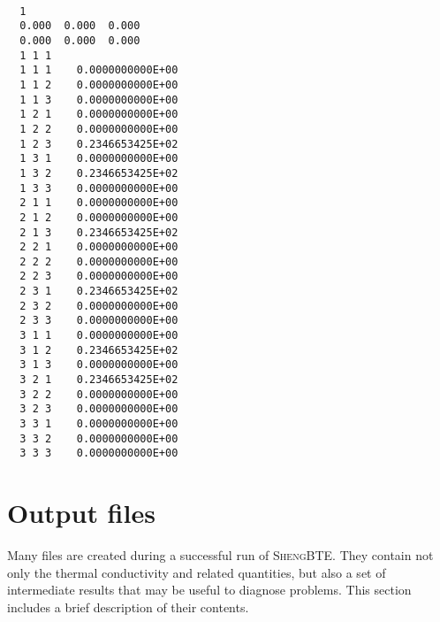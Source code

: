 \documentclass[a4paper,10pt,english]{article}
\begin{document}
\begin{Verbatim}
  
  1
  0.000  0.000  0.000
  0.000  0.000  0.000
  1 1 1
  1 1 1    0.0000000000E+00
  1 1 2    0.0000000000E+00
  1 1 3    0.0000000000E+00
  1 2 1    0.0000000000E+00
  1 2 2    0.0000000000E+00
  1 2 3    0.2346653425E+02
  1 3 1    0.0000000000E+00
  1 3 2    0.2346653425E+02
  1 3 3    0.0000000000E+00
  2 1 1    0.0000000000E+00
  2 1 2    0.0000000000E+00
  2 1 3    0.2346653425E+02
  2 2 1    0.0000000000E+00
  2 2 2    0.0000000000E+00
  2 2 3    0.0000000000E+00
  2 3 1    0.2346653425E+02
  2 3 2    0.0000000000E+00
  2 3 3    0.0000000000E+00
  3 1 1    0.0000000000E+00
  3 1 2    0.2346653425E+02
  3 1 3    0.0000000000E+00
  3 2 1    0.2346653425E+02
  3 2 2    0.0000000000E+00
  3 2 3    0.0000000000E+00
  3 3 1    0.0000000000E+00
  3 3 2    0.0000000000E+00
  3 3 3    0.0000000000E+00
\end{Verbatim}

\section{Output files}

Many files are created during a successful run of \textsc{ShengBTE}. They contain not only the thermal conductivity and related quantities, but also a set of intermediate results that may be useful to diagnose problems. This section includes a brief description of their contents.
\end{document}
